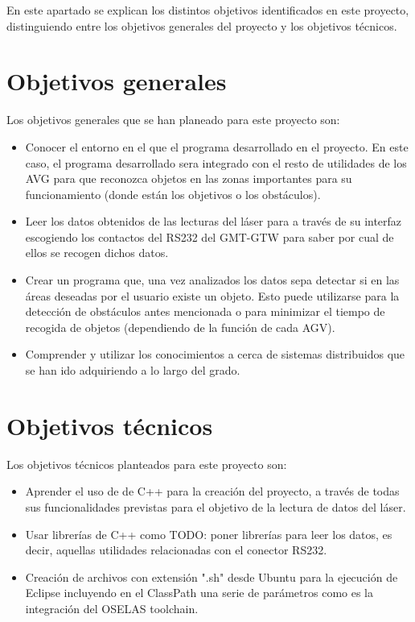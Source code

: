 
En este apartado se explican los distintos objetivos identificados en este proyecto, distinguiendo entre los objetivos generales del proyecto y los objetivos técnicos.

\section{Objetivos generales}

Los objetivos generales que se han planeado para este proyecto son:
\begin{itemize}
	\item Conocer el entorno en el que el programa desarrollado en el proyecto. En este caso, el programa desarrollado sera integrado con el resto de utilidades de los AVG para que reconozca objetos en las zonas importantes para su funcionamiento (donde están los objetivos o los obstáculos).
    \item Leer los datos obtenidos de las lecturas del láser para a través de su interfaz escogiendo los contactos del RS232 del GMT-GTW para saber por cual de ellos se recogen dichos datos.
    \item Crear un programa que, una vez analizados los datos sepa detectar si en las áreas deseadas por el usuario existe un objeto. Esto puede utilizarse para la detección de obstáculos antes mencionada o para minimizar el tiempo de recogida de objetos (dependiendo de la función de cada AGV).
    \item Comprender y utilizar los conocimientos a cerca de sistemas distribuidos que se han ido adquiriendo a lo largo del grado.
\end{itemize} 

\section{Objetivos técnicos}

Los objetivos técnicos planteados para este proyecto son:
\begin{itemize}
	\item Aprender el uso de de C++ para la creación del proyecto, a través de todas sus funcionalidades previstas para el objetivo de la lectura de datos del láser.
	\item Usar librerías de C++ como TODO: poner librerías para leer los datos, es decir, aquellas utilidades relacionadas con el conector RS232.
	\item Creación de archivos con extensión ".sh" desde Ubuntu para la ejecución de Eclipse incluyendo en el ClassPath una serie de parámetros como es la integración del OSELAS toolchain.
\end{itemize}

